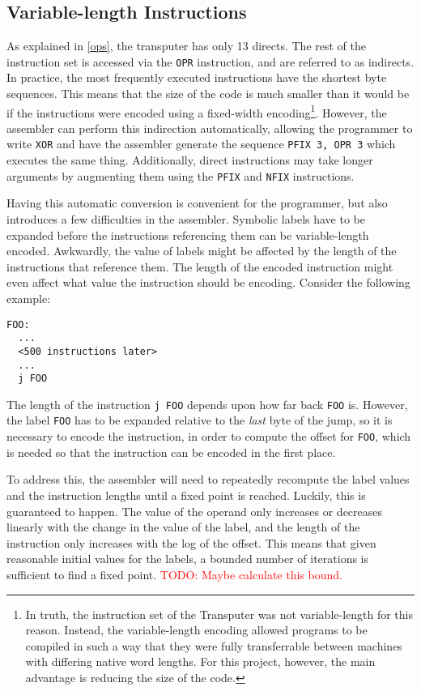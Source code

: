 \subsection{Variable-length Instructions}

As explained in \ref{ops}, the \Gls{transputer} has only 13 \gls{direct}s. The
rest of the instruction set is accessed via the \texttt{OPR} instruction, and
are referred to as \gls{indirect}s. In practice, the most frequently executed
instructions have the shortest byte sequences. This means that the size of the
code is much smaller than it would be if the instructions were encoded using a
fixed-width encoding\footnote{In truth, the instruction set of the Transputer
was not variable-length for this reason. Instead, the variable-length encoding
allowed programs to be compiled in such a way that they were fully transferrable
between machines with differing native word lengths. For this project, however,
the main advantage is reducing the size of the code.}. However, the assembler
can perform this indirection automatically, allowing the programmer to write
\texttt{XOR} and have the assembler generate the sequence \texttt{PFIX 3, OPR 3}
which executes the same thing. Additionally, direct instructions may take longer
arguments by augmenting them using the \texttt{PFIX} and \texttt{NFIX}
instructions.

Having this automatic conversion is convenient for the programmer, but also
introduces a few difficulties in the assembler. Symbolic labels have to be
expanded before the instructions referencing them can be variable-length
encoded. Awkwardly, the value of labels might be affected by the length of
the instructions that reference them. The length of the encoded instruction
might even affect what value the instruction should be encoding.
Consider the following example:

\begin{lstlisting}
FOO:
  ...
  <500 instructions later>
  ...
  j FOO
\end{lstlisting}

The length of the instruction \texttt{j FOO} depends upon how far back
\texttt{FOO} is. However, the label \texttt{FOO} has to be expanded relative to
the \textit{last} byte of the jump, so it is necessary to encode the
instruction, in order to compute the offset for \texttt{FOO}, which is needed so
that the instruction can be encoded in the first place.

To address this, the assembler will need to repeatedly recompute the label
values and the instruction lengths until a fixed point is reached. Luckily, this
is guaranteed to happen. The value of the operand only increases or decreases
linearly with the change in the value of the label, and the length of the
instruction only increases with the log of the offset. This means that given
reasonable initial values for the labels, a bounded number of iterations is
sufficient to find a fixed point. \textcolor{red}{TODO: Maybe calculate this
bound.}

